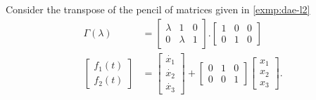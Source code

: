 \begin{example}
    Consider the transpose of the pencil of matrices given in \ref{exmp:dae-l2}
    \begin{align*}
        \Gamma(\lambda) &=
        \begin{bmatrix}
            \lambda & 1 & 0 \\
            0 & \lambda & 1
        \end{bmatrix}.
        \begin{bmatrix}
            1 & 0 & 0 \\
            0 & 1 & 0
        \end{bmatrix} \\
        \begin{bmatrix}
            f_{1}(t) \\
            f_{2}(t)
        \end{bmatrix} &=
        \begin{bmatrix}
            \dot{x_{1}} \\
            \dot{x_{2}} \\
            \dot{x_{3}}
        \end{bmatrix}
        + \begin{bmatrix}
            0 & 1 & 0 \\
            0 & 0 & 1
        \end{bmatrix}
        \begin{bmatrix}
            x_{1} \\
            x_{2} \\
            x_{3}
        \end{bmatrix}.
    \end{align*}
\end{example}